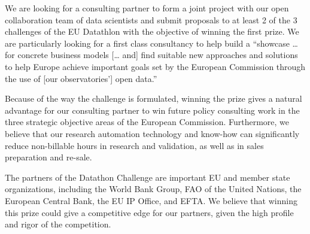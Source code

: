 \documentclass[
  a4paper,
  openany, a4paper, oneside]{book}
\begin{document}
We are looking for a consulting partner to form a joint project with our open collaboration team of data scientists and submit proposals to at least 2 of the 3 challenges of the EU Datathlon with the objective of winning the first prize. We are particularly looking for a first class consultancy to help build a ``showcase \ldots{} for concrete business models {[}\ldots{} and{]} find suitable new approaches and solutions to help Europe achieve important goals set by the European Commission through the use of {[}our observatories'{]} open data.''

Because of the way the challenge is formulated, winning the prize gives a natural advantage for our consulting partner to win future policy consulting work in the three strategic objective areas of the European Commission. Furthermore, we believe that our research automation technology and know-how can significantly reduce non-billable hours in research and validation, as well as in sales preparation and re-sale.

The partners of the Datathon Challenge are important EU and member state organizations, including the World Bank Group, FAO of the United Nations, the European Central Bank, the EU IP Office, and EFTA. We believe that winning this prize could give a competitive edge for our partners, given the high profile and rigor of the competition.

  
\end{document}
